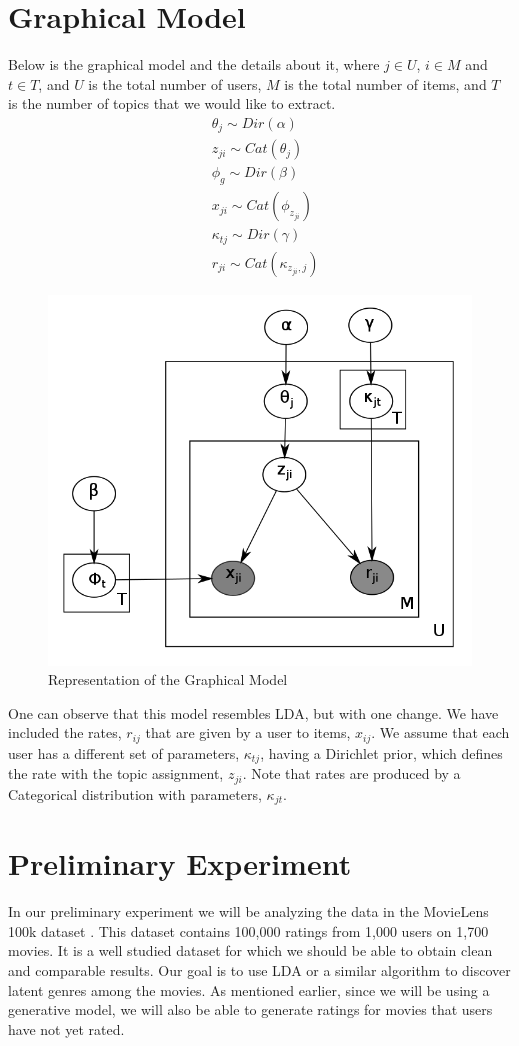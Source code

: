 \documentclass{article} %
\begin{document}
\section{Graphical Model}
\label{graph}
Below is the graphical model and the details about it, where $j \in U$, $i \in M$ 
and $t \in T$, and $U$ is the total number of users, $M$ is the total number of items, 
and $T$ is the number of topics that we would like to extract. 
\begin{align*}
  &\theta_j \sim Dir(\alpha)\\
  &z_{ji} \sim Cat(\theta_j)\\
  &\phi_g \sim Dir(\beta)\\
  &x_{ji} \sim Cat(\phi_{z_{ji}}) \\
  &\kappa_{tj} \sim Dir(\gamma)\\
  &r_{ji} \sim Cat(\kappa_{z_{ji},j})
\end{align*}
\clearpage
\begin{figure}[h]
    \begin{center}
      \includegraphics[width=.5\textwidth]{model.png}
      \caption{Representation of the Graphical Model}
      \label{fig:plot1}
    \end{center}
  \end{figure}
  
One can observe that this model resembles LDA, but with one change. We have 
included the rates, $r_{ij}$ that are given by a user to items, $x_{ij}$. We 
assume that each user has a different set of parameters, $\kappa_{tj}$, having a 
Dirichlet prior, which defines the rate with the topic assignment, $z_{ji}$. 
Note that rates are produced by a Categorical distribution with parameters, 
$\kappa_{jt}$. 

\section{Preliminary Experiment}
\label{exp}
In our preliminary experiment we will be analyzing the data in the MovieLens 100k
dataset \cite{movielens100k}. This dataset contains 100,000 ratings from 1,000
users on 1,700 movies. It is a well studied dataset for which we should be able
to obtain clean and comparable results. Our goal is to use LDA or a similar
algorithm to discover latent genres among the movies. As mentioned earlier,
since we will be using a generative model, we will also be able to generate
ratings for movies that users have not yet rated.
\end{document}
